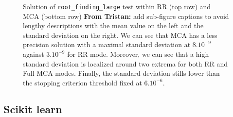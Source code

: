 \documentclass[11pt]{article}
\newcommand{\tristan}[1]{\color{orange}\textbf{From Tristan:} #1\color{black}\xspace}
\begin{document}
\begin{figure}
\begin{subfigure}{0.45\linewidth}
    \label{fig:my_label}
    \end{subfigure}
    \caption{Solution of \texttt{root\_finding\_large} test within RR (top row) and MCA (bottom row) \tristan{add sub-figure captions to avoid lengthy descriptions} with the mean value on the left and the standard deviation on the right. We can see that MCA has a less precision solution with a maximal standard deviation at $8.10^{-9}$ against $3.10^{-9}$ for RR mode. Moreover, we can see that a high standard deviation is localized around two extrema for both RR and Full MCA modes. Finally, the standard deviation stills lower than
    the stopping criterion threshold fixed at $6.10^{-6}$. }
    \label{fig:root_finding_large}
\end{figure}



\subsection{Scikit learn}
\label{sec:sklearn_tests}
\end{document}
